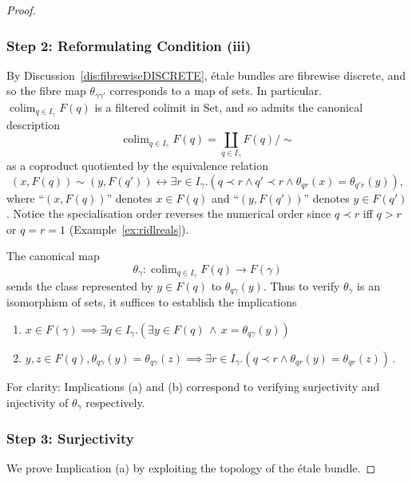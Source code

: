\documentclass[a4paper, 11pt,reqno]{amsart}
\newcommand{\Set}{\mathrm{Set}}
\DeclareMathOperator*{\colim}{colim}
\begin{document}
\begin{proof}
	\subsubsection*{Step 2: Reformulating Condition (iii)} By Discussion~\ref{dis:fibrewiseDISCRETE}, \'{e}tale bundles are fibrewise discrete, and so the fibre map $\theta_{\gamma\gamma'}$ corresponds to a map of sets. In particular. $\displaystyle\colim_{q\in I_\gamma} F(q)$ is a filtered colimit in $\Set$, and so admits the canonical description  
	\begin{equation}
	\colim_{q\in I_\gamma}F(q) = \coprod_{q\in I_{\gamma}} F(q)/\sim
	\end{equation}
	as a coproduct quotiented by the equivalence relation 
	\[(x,F(q))\sim (y,F(q')) \leftrightarrow \exists r\in I_{\gamma}. \left(q\prec r\land q'\prec r\land  \theta_{qr}(x)=\theta_{q'r}(y)\right), \]
	where ``$(x,F(q))$'' denotes $x\in F(q)$ and ``$(y,F(q'))$'' denotes $y\in F(q')$. Notice the specialisation order reverses the numerical order since $q\prec r$ iff $q>r$ or $q=r=1$ (Example~\ref{ex:ridlreals}).
	
	\smallskip
The canonical map
$$\theta_\gamma\colon
\colim_{q\in I_\gamma}F(q)\longrightarrow F(\gamma)$$
sends the class represented by $y\in F(q)$ to $\theta_{q\gamma}(y)$. Thus to verify $\theta_\gamma$ is an isomorphism of sets, it suffices to establish the implications 
	\begin{enumerate}[label=(\alph*)]
		\item $x\in F(\gamma ) \implies \exists q\in I_\gamma.\left(\exists y\in F(q)\,\land \,x=\theta_{q\gamma }(y)\right)$
		\item $y,z\in F(q),\theta_{q\gamma}(y)=\theta_{q\gamma}(z) \implies \exists r\in I_\gamma. (q\prec r \land \theta_{qr}(y)=\theta_{qr}(z))$\,.
	\end{enumerate}
For clarity: Implications (a) and (b) correspond to verifying surjectivity and injectivity of $\theta_\gamma$ respectively.
	
	
	\subsubsection*{Step 3: Surjectivity} We prove Implication (a) by exploiting the topology of the \'{e}tale bundle.
	

\end{proof}
\end{document}
